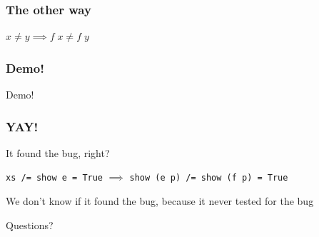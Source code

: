 \documentclass{beamer}
\begin{document}
\begin{frame}
    \frametitle{The other way}
    \centerline{$x \neq y \implies f\;x\neq f\;y$} 
\end{frame}

\begin{frame}
    \frametitle{Demo!}
        \Huge{\centerline{Demo!}}
\end{frame}

\begin{frame}
    \frametitle{YAY!}
    \centerline{It found the bug, right?}
    \pause
    \centerline{}
    \centerline{\texttt{xs /= show e = True} $\implies$ \texttt{show (e p) /= show (f p) = True}}
    \centerline{}
    \centerline{We don't know if it found the bug, because it never tested for the bug}
\end{frame}

\begin{frame}
    \Huge{\centerline{Questions?}}
\end{frame}
\end{document}
